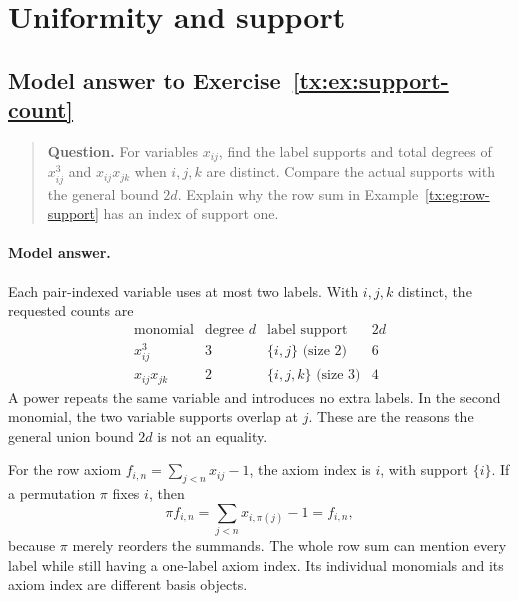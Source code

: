 \par


\section{Uniformity and support}

\begin{samepage}

\subsection*{Model answer to Exercise~\ref{tx:ex:support-count}}\label{tx:ans:support-count}

\begin{quote}\small\textbf{Question.} For variables $x_{ij}$, find the label supports and total degrees of
$x_{ij}^3$ and $x_{ij}x_{jk}$ when $i,j,k$ are distinct. Compare the
actual supports with the general bound $2d$. Explain why the row sum
in Example~\ref{tx:eg:row-support} has an index of support one.
\end{quote}

\paragraph{Model answer.}
Each pair-indexed variable uses at most two labels.
With \(i,j,k\) distinct, the requested counts are
\[
 \begin{array}{c|c|c|c}
 \text{monomial}&\text{degree }d&\text{label support}&2d\\ \hline
 x_{ij}^3&3&\{i,j\}\text{ (size }2)&6\\
 x_{ij}x_{jk}&2&\{i,j,k\}\text{ (size }3)&4
 \end{array}
\]
A power repeats the same variable and introduces no extra labels.
In the second monomial, the two variable supports overlap at \(j\).
These are the reasons the general union bound \(2d\) is not an equality.
\end{samepage}

For the row axiom \(f_{i,n}=\sum_{j<n}x_{ij}-1\), the axiom
index is \(i\), with support \(\{i\}\). If a permutation \(\pi\)
fixes \(i\), then
\[
 \pi f_{i,n}=\sum_{j<n}x_{i,\pi(j)}-1=f_{i,n},
\]
because \(\pi\) merely reorders the summands. The whole row sum can
mention every label while still having a one-label axiom index.
Its individual monomials and its axiom index are different basis objects.


